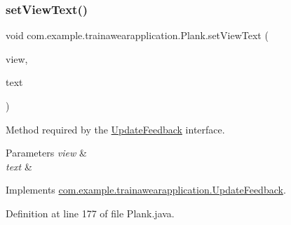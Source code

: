 \mbox{\label{classcom_1_1example_1_1trainawearapplication_1_1_plank_a4d4a46b71ced8fe89023ccbf14d17f77}} 
\subsubsection{\texorpdfstring{setViewText()}{setViewText()}}
{\footnotesize\ttfamily void com.\+example.\+trainawearapplication.\+Plank.\+set\+View\+Text (\begin{DoxyParamCaption}\item[{Text\+View}]{view,  }\item[{String}]{text }\end{DoxyParamCaption})}



Method required by the \mbox{\hyperlink{interfacecom_1_1example_1_1trainawearapplication_1_1_update_feedback}{Update\+Feedback}} interface. 


\begin{DoxyParams}{Parameters}
{\em view} & \\
\hline
{\em text} & \\
\hline
\end{DoxyParams}


Implements \mbox{\hyperlink{interfacecom_1_1example_1_1trainawearapplication_1_1_update_feedback_a7a026880188b11aca6d8184d57e699e8}{com.\+example.\+trainawearapplication.\+Update\+Feedback}}.



Definition at line 177 of file Plank.\+java.


\begin{DoxyCode}{0}

\end{DoxyCode}
\mbox{\label{classcom_1_1example_1_1trainawearapplication_1_1_plank_a14343873d9ff489757bebbad97adbaf1}} 
